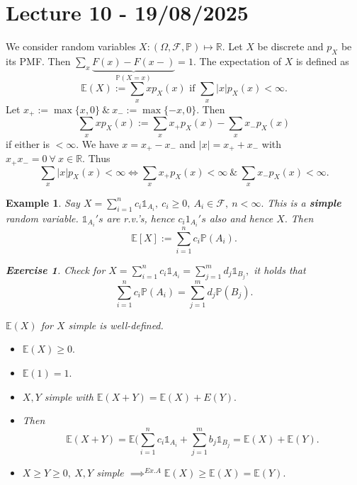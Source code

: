 \documentclass{article}
\newcommand{\1}{\mathds{1}}
\newcommand{\R}{\mathbb{R}}
\newcommand{\E}{\mathbb{E}}
\newcommand{\F}{\mathcal{F}}
\newcommand{\PB}{\mathbb{P}}
\newcommand{\lf}{\left}
\newcommand{\rg}{\right}
\newcommand{\card}[1]{\lf\vert #1\rg\vert}
\newtheorem{example}{Example}
\newtheorem{exercise}{Exercise}
\begin{document}
\section{Lecture 10 - 19/08/2025}
We consider random variables $X:(\Omega,\F,\PB)\mapsto\R.$ Let $X$ be discrete and $p_X$ be its PMF. Then $\sum_x\underbrace{F(x)-F(x-)}_{\PB(X=x)}=1.$ The expectation of $X$ is defined as $$\E(X):=\sum_xxp_X(x)\text{ if }\sum_x\card{x}p_X(x)<\infty.$$
Let $x_+:=\max\{x,0\}\ \&\ x_-:=\max\{-x,0\}.$ Then $$\sum_xxp_X(x):=\sum_xx_+p_X(x)-\sum_xx_-p_X(x)$$ if either is $<\infty.$
We have $x=x_+-x_-$ and $\card{x}=x_++x_-$ with $x_+x_-=0\ \forall\ x\in\R.$ Thus $$\sum_x\card{x}p_X(x)<\infty\iff \sum_xx_+p_X(x)<\infty\ \&\ \sum_xx_-p_X(x)<\infty.$$
\begin{example}
    Say $X=\sum_{i=1}^nc_i\1_{A_i},\ c_i\geq 0,\ A_i\in\F,\ n<\infty.$ This is a \textbf{simple} random variable. $\1_{A_i}'s$ are r.v.'s, hence $c_i1_{A_i}'s$ also and hence $X.$ Then $$\E[X]:=\sum_{i=1}^nc_i\PB(A_i).$$ 
    \begin{exercise}
        Check for $X=\sum_{i=1}^nc_i\1_{A_i}=\sum_{j=1}^md_j\1_{B_j},$ it holds that $$\sum_{i=1}^nc_i\PB(A_i)=\sum_{j=1}^md_j\PB(B_j).$$
    \end{exercise}
$\E(X)$ for $X$ simple is well-defined. 
\begin{itemize}
    \item $\E(X)\ge 0.$
    \item $\E(1)=1.$
    \item  $X,Y$ simple with $\E(X+Y)=\E(X)+E(Y).$
    \item Then $$\E(X+Y)=\E(\sum_{i=1}^nc_i\1_{A_i}+\sum_{j=1}^mb_j\1_{B_j}=\E(X)+\E(Y).$$
    \item $X\ge Y\ge 0,\ X,Y$ simple $\implies^{Ex. A}\E(X)\ge \E(X)=\E(Y).$
\end{itemize}
\end{example}
\end{document}
